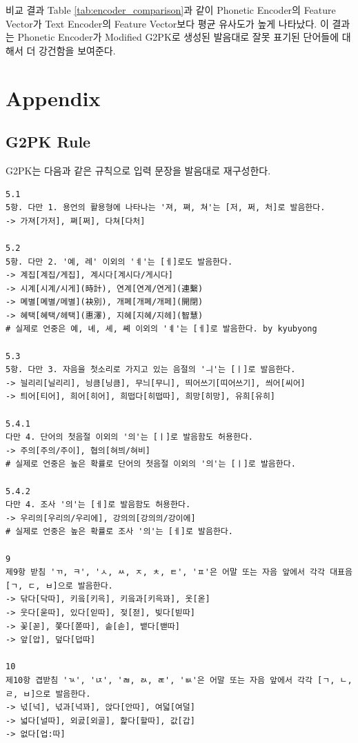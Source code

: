\documentclass[letterpaper]{article} %
\begin{document}
비교 결과 Table \ref{tab:encoder_comparison}과 같이 Phonetic Encoder의 Feature Vector가 Text Encoder의 Feature Vector보다 평균 유사도가 높게 나타났다. 이 결과는 Phonetic Encoder가 Modified G2PK로 생성된 발음대로 잘못 표기된 단어들에 대해서 더 강건함을 보여준다. 

\clearpage
\section{Appendix}
\subsection{G2PK Rule} \label{sec:g2pk_rule}
G2PK는 다음과 같은 규칙으로 입력 문장을 발음대로 재구성한다.

\begin{verbatim}
5.1
5항. 다만 1. 용언의 활용형에 나타나는 '져, 쪄, 쳐'는 [저, 쩌, 처]로 발음한다.
-> 가져[가저], 쪄[쩌], 다쳐[다처]

5.2
5항. 다만 2. '예, 례' 이외의 'ㅖ'는 [ㅔ]로도 발음한다.
-> 계집[계집/게집], 계시다[계시다/게시다]
-> 시계[시계/시게](時計), 연계[연계/연게](連繫)
-> 몌별[몌별/메별](袂別), 개폐[개폐/개페](開閉)
-> 혜택[혜택/헤택](惠澤), 지혜[지혜/지헤](智慧)
# 실제로 언중은 예, 녜, 셰, 쎼 이외의 'ㅖ'는 [ㅔ]로 발음한다. by kyubyong

5.3
5항. 다만 3. 자음을 첫소리로 가지고 있는 음절의 'ㅢ'는 [ㅣ]로 발음한다.
-> 늴리리[닐리리], 닁큼[닝큼], 무늬[무니], 띄어쓰기[띠어쓰기], 씌어[씨어]
-> 틔어[티어], 희어[히어], 희떱다[히떱따], 희망[히망], 유희[유히]

5.4.1
다만 4. 단어의 첫음절 이외의 '의'는 [ㅣ]로 발음함도 허용한다.
-> 주의[주의/주이], 협의[혀븨/혀비]
# 실제로 언중은 높은 확률로 단어의 첫음절 이외의 '의'는 [ㅣ]로 발음한다.

5.4.2
다만 4. 조사 '의'는 [ㅔ]로 발음함도 허용한다.
-> 우리의[우리의/우리에], 강의의[강의의/강이에]
# 실제로 언중은 높은 확률로 조사 '의'는 [ㅔ]로 발음한다.

9
제9항 받침 'ㄲ, ㅋ', 'ㅅ, ㅆ, ㅈ, ㅊ, ㅌ', 'ㅍ'은 어말 또는 자음 앞에서 각각 대표음 [ㄱ, ㄷ, ㅂ]으로 발음한다.
-> 닦다[닥따], 키읔[키윽], 키읔과[키윽꽈], 옷[옫]
-> 웃다[욷따], 있다[읻따], 젖[젇], 빚다[빋따]
-> 꽃[꼳], 쫓다[쫃따], 솥[솓], 뱉다[밷따]
-> 앞[압], 덮다[덥따]

10
제10항 겹받침 'ㄳ', 'ㄵ', 'ㄼ, ㄽ, ㄾ', 'ㅄ'은 어말 또는 자음 앞에서 각각 [ㄱ, ㄴ, ㄹ, ㅂ]으로 발음한다.
-> 넋[넉], 넋과[넉꽈], 앉다[안따], 여덟[여덜]
-> 넓다[널따], 외곬[외골], 핥다[할따], 값[갑]
-> 없다[업:따]


\end{verbatim}
\end{document}
